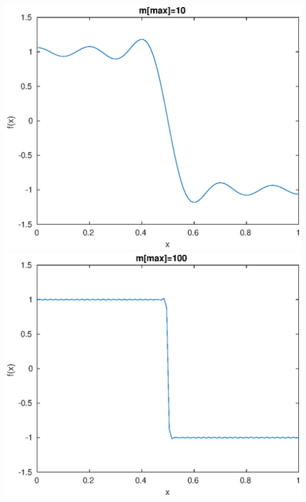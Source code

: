 \documentclass{jreport}
\begin{document}
\includegraphics[scale=0.3]{1_10.eps}
\includegraphics[scale=0.3]{1_100.eps}
\newpage
\end{document}

